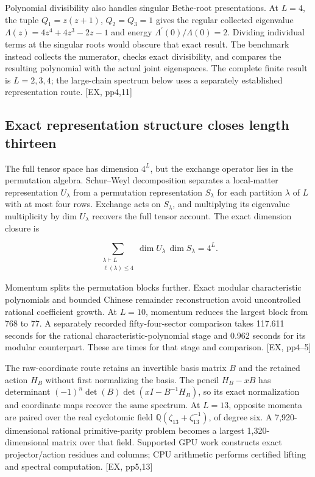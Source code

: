 Polynomial divisibility also handles singular Bethe-root presentations. At \(L=4\), the tuple \(Q_1=z(z+1)\), \(Q_2=Q_3=1\) gives the regular collected eigenvalue \(\Lambda(z)=4z^4+4z^3-2z-1\) and energy \(\Lambda^\prime(0)/\Lambda(0)=2\). Dividing individual terms at the singular roots would obscure that exact result. The benchmark instead collects the numerator, checks exact divisibility, and compares the resulting polynomial with the actual joint eigenspaces. The complete finite result is \(L=2,3,4\); the large-chain spectrum below uses a separately established representation route. {[}EX, pp4,11{]}

\subsection{Exact representation structure closes length thirteen}\label{exact-representation-structure-closes-length-thirteen}

The full tensor space has dimension \(4^L\), but the exchange operator lies in the permutation algebra. Schur--Weyl decomposition separates a local-matter representation \(U_\lambda\) from a permutation representation \(S_\lambda\) for each partition \(\lambda\) of \(L\) with at most four rows. Exchange acts on \(S_\lambda\), and multiplying its eigenvalue multiplicity by dim \(U_\lambda\) recovers the full tensor account. The exact dimension closure is

\[
\sum_{\substack{\lambda\vdash L\\\ell(\lambda)\le4}}\dim U_\lambda\,\dim S_\lambda=4^L.
\]

Momentum splits the permutation blocks further. Exact modular characteristic polynomials and bounded Chinese remainder reconstruction avoid uncontrolled rational coefficient growth. At \(L=10\), momentum reduces the largest block from 768 to 77. A separately recorded fifty-four-sector comparison takes 117.611 seconds for the rational characteristic-polynomial stage and 0.962 seconds for its modular counterpart. These are times for that stage and comparison. {[}EX, pp4--5{]}

The raw-coordinate route retains an invertible basis matrix \(B\) and the retained action \(H_B\) without first normalizing the basis. The pencil \(H_B-xB\) has determinant \((-1)^n\det(B)\det(xI-B^{-1}H_B)\), so its exact normalization and coordinate maps recover the same spectrum. At \(L=13\), opposite momenta are paired over the real cyclotomic field \(\mathbb Q(\zeta_{13}+\zeta_{13}^{-1})\), of degree six. A 7,920-dimensional rational primitive-parity problem becomes a largest 1,320-dimensional matrix over that field. Supported GPU work constructs exact projector/action residues and columns; CPU arithmetic performs certified lifting and spectral computation. {[}EX, pp5,13{]}

